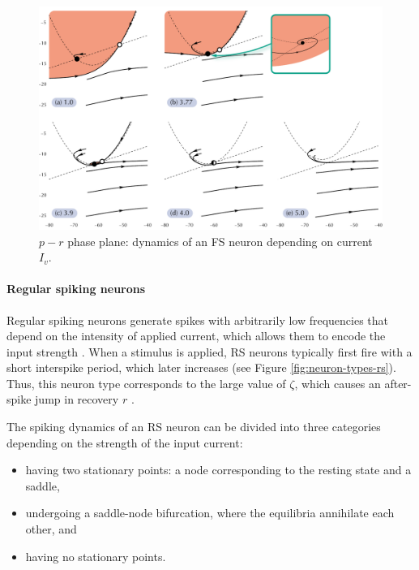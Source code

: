 \begin{figure}[!htp]
    \centering
    \includegraphics[width=\textwidth]{src/assets/images/neural-dynamics/nd-fs.pdf}
    \caption[Dynamics of an FS neuron]{$p-r$ phase plane: dynamics of an FS neuron depending on current $I_v$.}
    \label{fig:neural-dynamics-fs}
\end{figure}

\paragraph{Regular spiking neurons}

Regular spiking neurons generate spikes with arbitrarily low frequencies that depend on the intensity of applied current, which allows them to encode the input strength \cite{IzhikevichBook2004:10}.
When a stimulus is applied, RS neurons typically first fire with a short interspike period, which later increases (see Figure \ref{fig:neuron-types-rs}).    Thus, this neuron type corresponds to the large value of $\zeta$, which causes an after-spike jump in recovery $r$ \cite{Izhikevich2003}.

The spiking dynamics of an RS neuron can be divided into three categories depending on the strength of the input current:
\begin{itemize}
    \item having two stationary points: a node corresponding to the resting state and a saddle,
    \item undergoing a saddle-node bifurcation, where the equilibria annihilate each other, and
    \item having no stationary points.
\end{itemize}

